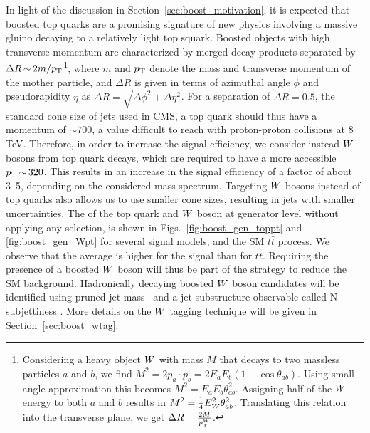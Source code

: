 

In light of the discussion in Section~\ref{sec:boost_motivation}, it is expected that boosted top
quarks are a promising signature of new physics involving a massive gluino decaying to a relatively
light top squark.
Boosted objects with high transverse momentum are characterized by merged decay products
separated by $ \Delta R \,{\sim}\, 2m/p_{\mathrm{T}}$\footnote{Considering a heavy object $W$ with mass $M$
that decays to two massless particles $a$ and $b$, we find $M^2 = 2 p_a \cdot p_b = 2 E_a E_b (1
- \cos{\theta_{ab}})$. Using small angle approximation this becomes $M^2 = E_a E_b
\theta_{ab}^2$. Assigning half of the $W$ energy to both $a$ and $b$ results in $M^2 =
\frac{1}{4} E_{W}^2 \theta_{ab}^2$. Translating this relation into the transverse plane, we get
$\Delta R = \frac{2 M}{p_{\mathrm{T}}^{W}}$.}, 
where $m$ and $p_{\mathrm{T}}$ denote the mass and transverse momentum of the mother particle, and $\Delta R$
is given in terms of azimuthal angle $\phi$ and pseudorapidity $\eta$ as $\Delta R = \sqrt{\Delta
\phi^2 + \Delta \eta^2}$.
For a separation of $\Delta R = 0.5$, the standard cone size of jets used in CMS, a top
quark should thus have a momentum of ${\sim}700$\GeV, a value difficult to reach with proton-proton
collisions at 8 TeV. 
Therefore, in order to increase the signal efficiency, we consider instead $W$ bosons from top
quark decays, which are required to have a more accessible $p_{\mathrm{T}} \,{\sim}\, 320$\GeV.  This results
in an increase in the signal efficiency of a factor of about 3--5, depending on the considered mass
spectrum. 
Targeting $W$ bosons instead of top quarks also allows us to use smaller cone sizes, resulting in
jets with smaller uncertainties.
The \pt of the top quark and $W$ boson at generator
level without applying any selection, is shown in Figs.~\ref{fig:boost_gen_toppt} and
\ref{fig:boost_gen_Wpt} for several signal models, and the SM $t\bar{t}$ process. 
We observe that the average \pt is higher for the signal than for $t\bar{t}$. Requiring the
presence of a boosted $W$ boson will thus be part of the strategy to reduce the SM background.
Hadronically decaying boosted $W$ boson candidates will be identified using pruned jet
mass~\cite{Ellis:2009su,Ellis:2009me,Chatrchyan:2013vbb} and a jet substructure observable
called N-subjettiness \cite{Thaler:2010tr}. More details on the $W$ tagging technique will be given
in Section~\ref{sec:boost_wtag}. 

